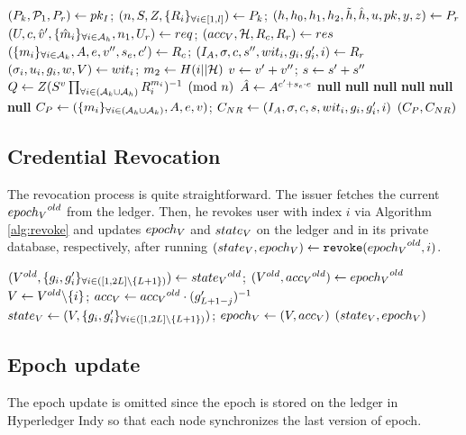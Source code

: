 \documentclass{article}
\begin{document}
\begin{algorithm}
\caption{$\crfinishp $}
\label{alg:ci3}
\begin{algorithmic}
	\State $\pkip \la \pki $; $\pkp \la \pk $; 
	\State $\prp \la \pr $
	\State $\reqp \la req$; $\resp \la res$
	\State $\rcp \la \rc $; $\rrp \la \rr $
	\State $\witip \la \witi$; $m_2\la H(i||\mch )$
	\State $v\la v' + v''$; $s\la s' + s''$
	\State $Q\la Z(S^{v}\prodi{i}{(\ak \cup \ah)}{R_{i}^{m_{i}}})^{-1}\pmod{n}$
	\State $\hat{A}\la A^{c'+s_{e}\cdot e}$
		\State \Return \textbf{null}
		\State \Return \textbf{null}
		\State \Return \textbf{null}
		\State \Return \textbf{null}
		\State \Return \textbf{null}
		\State \Return \textbf{null}
	\Else \State $\cp \la \cpp$; $\cnr \la \cnrp$
	\State \Return $(\cpnr )$
	\EndIf
\end{algorithmic}
\end{algorithm}

\subsection{Credential Revocation}
The revocation process is quite straightforward. The issuer fetches the current $\old{\epv }$ from the ledger. Then, he revokes user with index $i$ via Algorithm \ref{alg:revoke} and updates $\epv $ and $\stv$ on the ledger and in its private database, respectively, after running $(\stv ,\epv )\la \mt{revoke}(\old{\epv}, i)$. 

\begin{algorithm}
\caption{$\mt{revoke}(\old{\stv}, \old{\epv }, i)$}
\label{alg:revoke}
\begin{algorithmic}
	\State $(\old{V}, \stpp )\la \old{\stv }$; $(\old{V}, \old{\accv })\la \old{\epv }$
	\State $V \la \old{V} \backslash \{i\}$; $\accv \la \old{\accv }\cdot (\gllj)^{-1}$
	\State $\stv \la (V, \stpp)$;  $\epv \la (V, \accv )$
	\State \Return $(\stv ,\epv )$
\end{algorithmic}
\end{algorithm}

\subsection{Epoch update}
The epoch update is omitted since the epoch is stored on the ledger in Hyperledger Indy so that each node synchronizes the last version of epoch.
\end{document}
